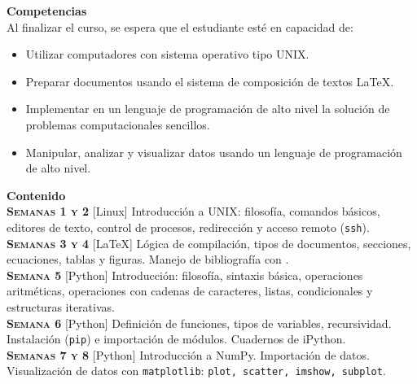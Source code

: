 \documentclass[letterpaper,10pt,onecolumn]{article}
\begin{document}
\noindent\textbf{\large {} \quad Competencias}\\[-0.2cm]

\noindent\normalsize Al finalizar el curso, se espera que el estudiante esté en capacidad de:

\begin{itemize}
	\item Utilizar computadores con sistema operativo tipo UNIX.\\[-0.6cm]
	\item Preparar documentos usando el sistema de composición de textos \LaTeX.\\[-0.6cm]
	\item Implementar en un lenguaje de programación de alto nivel la solución de problemas computacionales sencillos.\\[-0.6cm]
	\item Manipular, analizar y visualizar datos usando un lenguaje de programación de alto nivel.\\[-0.2cm]
\end{itemize}

\noindent\textbf{\large {} \quad Contenido}\\[-0.2cm]

\noindent\normalsize \textbf{\textsc{Semanas 1 y 2}} [Linux] Introducción a UNIX: filosofía, comandos básicos, editores de texto, control de procesos, redirección y acceso remoto (\verb+ssh+).\\[-0.3cm]

\noindent\textbf{\textsc{Semanas 3 y 4}} [\LaTeX] Lógica de compilación, tipos de documentos, secciones, ecuaciones, tablas y figuras. Manejo de bibliografía con \BibTeX.\\[-0.3cm]

\noindent\textbf{\textsc{Semana 5}} [Python] Introducción: filosofía, sintaxis básica, operaciones aritméticas, operaciones con cadenas de caracteres, listas, condicionales y estructuras iterativas.\\[-0.3cm]

\noindent\textbf{\textsc{Semana 6}} [Python] Definición de funciones, tipos de variables, recursividad. Instalación (\verb+pip+) e importación de módulos. Cuadernos de iPython.\\[-0.3cm]

\noindent\textbf{\textsc{Semanas 7 y 8}} [Python] Introducción a NumPy.  Importación de datos. Visualización de datos con \verb+matplotlib+: \verb+plot, scatter, imshow, subplot+.\\[-0.3cm]
\end{document}
